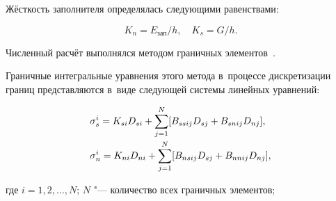 Жёсткость заполнителя определялась следующими равенствами:  

 $$K_{n}={E_{\text{зап}}}/{h}, \quad  K_{s}={G}/{h}.$$  







 













Численный расчёт выполнялся методом граничных элементов~\cite{SpirBel:bib:Krauch}.

Граничные интегральные уравнения этого метода в~процессе дискретизации границ  представляются в~виде следующей системы линейных уравнений:

\begin{equation}

\label{for1}

\begin{array}{l}

\displaystyle

\sigma^{i}_{s}=K_{si}{D}_{si}+\sum\limits_{j=1}^N [B_{ssij} D_{sj}+B_{snij} D_{nj}], \vspace{1mm} \\

\displaystyle

\sigma^{i}_{n}=K_{ni}{D}_{ni}+\sum\limits_{j=1}^N [B_{nsij} D_{sj}+B_{nnij} D_{nj}],	

\end{array}

\end{equation}

где $i=1, 2, \dots, N$; $N$ "--- количество всех граничных элементов;

